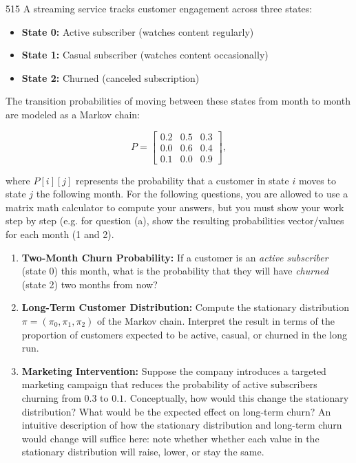\documentclass[11pt]{article}
\begin{document}
\begin{problem}{5}{15}
A streaming service tracks customer engagement across three states:

\begin{itemize}
    \item \textbf{State 0:} Active subscriber (watches content regularly)
    \item \textbf{State 1:} Casual subscriber (watches content occasionally)
    \item \textbf{State 2:} Churned (canceled subscription)
\end{itemize}

The transition probabilities of moving between these states from month to month are modeled as a Markov chain:

\[
P = 
\begin{bmatrix}
0.2 & 0.5 & 0.3 \\
0.0 & 0.6 & 0.4 \\
0.1 & 0.0 & 0.9
\end{bmatrix},
\]

where $P[i][j]$ represents the probability that a customer in state $i$ moves to state $j$ the following month. For the following questions, you are allowed to use a matrix math calculator to compute your answers, but you must show your work step by step (e.g. for question (a), show the resulting probabilities vector/values for each month (1 and 2).

\begin{enumerate}[label=(\alph*)]
    \item \textbf{Two-Month Churn Probability:}  
    If a customer is an \textit{active subscriber} (state 0) this month, what is the probability that they will have \textit{churned} (state 2) two months from now?
    
    \item \textbf{Long-Term Customer Distribution:}  
    Compute the stationary distribution $\pi = (\pi_0, \pi_1, \pi_2)$ of the Markov chain. Interpret the result in terms of the proportion of customers expected to be active, casual, or churned in the long run.
    
    \item \textbf{Marketing Intervention:}  
    Suppose the company introduces a targeted marketing campaign that reduces the probability of active subscribers churning from $0.3$ to $0.1$. Conceptually, how would this change the stationary distribution? What would be the expected effect on long-term churn? An intuitive description of how the stationary distribution and long-term churn would change will suffice here: note whether whether each value in the stationary distribution will raise, lower, or stay the same.
\end{enumerate}
\end{problem}
\end{document}
